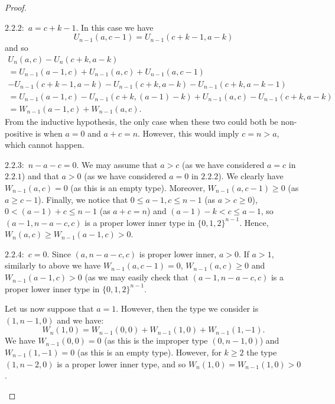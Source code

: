 \documentclass[11pt, reqno]{amsart}
\newenvironment{caseindent}[1][2em]
  {%
    \begin{list}{}{%
      \setlength{\leftmargin}{#1}%
      \setlength{\rightmargin}{0pt}%
      \setlength{\topsep}{0pt}%
      \setlength{\partopsep}{0pt}%
      \setlength{\itemsep}{0pt}%
      \setlength{\parsep}{\parskip}%
      \setlength{\listparindent}{\parindent}%
    }%
    \item[]%
    \let\fullwidthdisplay\relax
    \ignorespaces
  }
  {%
    \end{list}%
    \ignorespacesafterend
  }
\theoremstyle{remark}
\numberwithin{equation}{section}
\newcommand{\wn}{W_{n}}
\newcommand{\wno}{W_{n-1}}
\newcommand{\un}{U_{n}}
\newcommand{\uno}{U_{n-1}}
\begin{document}
\begin{proof}
\begin{caseindent}
\begin{caseindent}
        $2.2.2:$ $a=c+k-1$. In this case we have
            \begin{equation*}
                \uno(a, c-1)=\uno(c+k-1, a-k)
            \end{equation*}
            and so
            \begin{multline*}
                \un(a, c)-\un(c+k, a-k)\\
                = \uno(a-1, c) + \uno(a, c) + \uno(a, c-1)\\
                - \uno(c+k-1, a-k) - \uno(c+k, a-k) - \uno(c+k, a-k-1)\\
                =\uno(a-1, c) - \uno(c+k, (a-1)-k) + \uno(a, c) - \uno(c+k, a-k)\\
                =\wno(a-1, c)+\wno(a, c).
            \end{multline*}
            From the inductive hypothesis, the only case when these two could both be non-positive is when $a=0$ and $a+c=n$. However, this would imply $c=n>a$, which cannot happen.

        $2.2.3:$ $n-a-c=0$. We may assume that $a>c$ (as we have considered $a=c$ in $2.2.1$) and that $a>0$ (as we have considered $a=0$ in $2.2.2$). We clearly have $\wno(a, c)=0$ (as this is an empty type). Moreover, $\wno(a, c-1) \geqslant 0$ (as $a \geqslant c-1$). Finally, we notice that $0 \leqslant a-1, c \leqslant n-1$ (as $a>c\geqslant 0$), $0<(a-1)+c \leqslant n-1$ (as $a+c=n$) and $(a-1)-k<c \leqslant a-1$, so $(a-1, n-a-c, c)$ is a proper lower inner type in $\{0, 1, 2\}^{n-1}$. Hence, $\wn(a, c) \geqslant \wno(a-1, c) > 0$.

        $2.2.4:$ $c=0$. Since $(a, n-a-c, c)$ is proper lower inner, $a>0$. If $a>1$, similarly to above we have $\wno(a, c-1)=0$, $\wno(a, c) \geqslant 0$ and $\wno(a-1, c)>0$ (as we may easily check that $(a-1, n-a-c, c)$ is a proper lower inner type in $\{0, 1, 2\}^{n-1}$.

        Let us now suppose that $a=1$. However, then the type we consider is $(1, n-1, 0)$ and we have:
            \begin{equation*}
                \wn(1, 0) = \wno(0, 0) + \wno(1, 0) + \wno(1, -1).
            \end{equation*}
        We have $\wno(0,0)=0$ (as this is the improper type $(0, n-1,0)$) and $\wno(1, -1)=0$ (as this is an empty type). However, for $k \geqslant 2$ the type $(1, n-2, 0)$ is a proper lower inner type, and so $\wn(1, 0)=\wno(1, 0)>0$. \qedhere
        \end{caseindent}
    \end{caseindent}
\end{proof}
\end{document}
